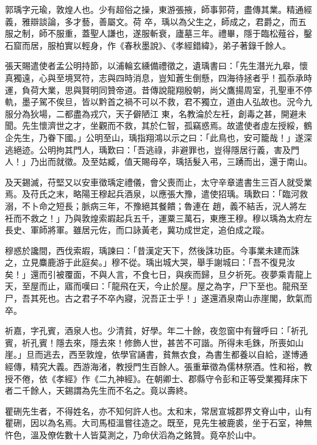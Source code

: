 \begin{pinyinscope}
 郭瑀字元瑜，敦煌人也。少有超俗之操，東游張掖，師事郭荷，盡傳其業。精通經義，雅辯談論，多才藝，善屬文。荷
 卒，瑀以為父生之，師成之，君爵之，而五服之制，師不服重，蓋聖人謙也，遂服斬衰，廬墓三年。禮畢，隱于臨松薤谷，鑿石窟而居，服柏實以輕身，作《春秋墨說》、《孝經錯緯》，弟子著錄千餘人。



 張天賜遣使者孟公明持節，以浦輪玄纁備禮徵之，遺瑀書曰：「先生潛光九皋，懷真獨遠，心與至境冥符，志與四時消息，豈知蒼生倒懸，四海待拯者乎！孤忝承時運，負荷大業，思與賢明同贊帝道。昔傳說龍翔殷朝，尚父鷹揚周室，孔聖車不停軌，墨子駕不俟旦，皆以黔首之禍不可以不救，君不獨立，道由人弘故也。況今九服分為狄場，二都盡為戎穴，天子僻陋江
 東，名教淪於左衽，創毒之甚，開避未聞。先生懷濟世之才，坐觀而不救，其於仁智，孤竊惑焉。故遣使者虛左授綏，鶴企先生，乃眷下國。」公明至山，瑀指翔鴻以示之曰：「此鳥也，安可籠哉！」遂深逃絕迹。公明拘其門人，瑀歎曰：「吾逃祿，非避罪也，豈得隱居行義，害及門人！」乃出而就徵。及至姑臧，值天賜母卒，瑀括髮入弔，三踴而出，還于南山。



 及天錫滅，苻堅又以安車徵瑀定禮儀，會父喪而止，太守辛章遣書生三百人就受業焉。及苻氏之末，略陽王穆起兵酒泉，以應張大豫，遣使招瑀。瑀歎曰：「臨河救溺，不卜命之短長；脈病三年，不豫絕其餐饋；魯連在
 趙，義不結舌，況人將左衽而不救之！」乃與敦煌索嘏起兵五千，運粟三萬石，東應王穆。穆以瑀為太府左長史、軍師將軍。雖居元佐，而口詠黃老，冀功成世定，追伯成之蹤。



 穆惑於讒間，西伐索嘏，瑀諫曰：「昔漢定天下，然後誅功臣。今事業未建而誅之，立見麋鹿游于此庭矣。」穆不從。瑀出城大哭，舉手謝城曰：「吾不復見汝矣！」還而引被覆面，不與人言，不食七日，與疾而歸，旦夕祈死。夜夢乘青龍上天，至屋而止，寤而嘆曰：「龍飛在天，今止於屋。屋之為字，尸下至也。龍飛至尸，吾其死也。古之君子不卒內寢，況吾正士乎！」遂還酒泉南山赤崖閣，飲氣而卒。



 祈嘉，字孔賓，酒泉人也。少清貧，好學。年二十餘，夜忽窗中有聲呼曰：「祈孔賓，祈孔賓！隱去來，隱去來！修飾人世，甚苦不可諧。所得未毛銖，所喪如山崖。」旦而逃去，西至敦煌，依學官誦書，貧無衣食，為書生都養以自給，遂博通經傳，精究大義。西游海渚，教授門生百餘人。張重華徵為儒林祭酒。性和裕，教授不倦，依《孝經》作《二九神經》。在朝卿士、郡縣守令彭和正等受業獨拜床下者二千餘人，天錫謂為先生而不名之。竟以壽終。



 瞿硎先生者，不得姓名，亦不知何許人也。太和末，常居宣城郡界文脊山中，山有瞿硎，因以為名焉。大司馬桓溫嘗往造之。既至，見先生被鹿裘，坐于石室，神無忤色，溫及僚佐數十人皆莫測之，乃命伏滔為之銘贊。竟卒於山中。




\end{pinyinscope}
